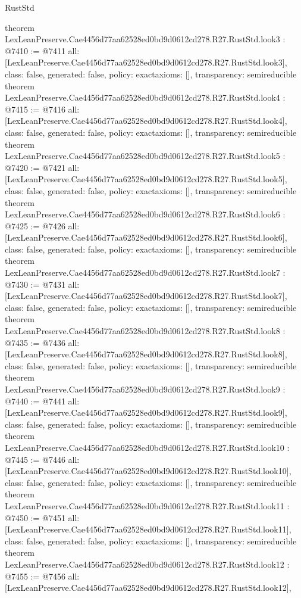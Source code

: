 \begin{lexlean}{RustStd}
\begin{coremodule}
{}
theorem LexLeanPreserve.Cae4456d77aa62528ed0bd9d0612cd278.R27.RustStd.look3 : @7410 := @7411 {
  all: [LexLeanPreserve.Cae4456d77aa62528ed0bd9d0612cd278.R27.RustStd.look3],
  class: false,
  generated: false,
  policy: exact{axioms: []},
  transparency: semireducible
}
theorem LexLeanPreserve.Cae4456d77aa62528ed0bd9d0612cd278.R27.RustStd.look4 : @7415 := @7416 {
  all: [LexLeanPreserve.Cae4456d77aa62528ed0bd9d0612cd278.R27.RustStd.look4],
  class: false,
  generated: false,
  policy: exact{axioms: []},
  transparency: semireducible
}
theorem LexLeanPreserve.Cae4456d77aa62528ed0bd9d0612cd278.R27.RustStd.look5 : @7420 := @7421 {
  all: [LexLeanPreserve.Cae4456d77aa62528ed0bd9d0612cd278.R27.RustStd.look5],
  class: false,
  generated: false,
  policy: exact{axioms: []},
  transparency: semireducible
}
theorem LexLeanPreserve.Cae4456d77aa62528ed0bd9d0612cd278.R27.RustStd.look6 : @7425 := @7426 {
  all: [LexLeanPreserve.Cae4456d77aa62528ed0bd9d0612cd278.R27.RustStd.look6],
  class: false,
  generated: false,
  policy: exact{axioms: []},
  transparency: semireducible
}
theorem LexLeanPreserve.Cae4456d77aa62528ed0bd9d0612cd278.R27.RustStd.look7 : @7430 := @7431 {
  all: [LexLeanPreserve.Cae4456d77aa62528ed0bd9d0612cd278.R27.RustStd.look7],
  class: false,
  generated: false,
  policy: exact{axioms: []},
  transparency: semireducible
}
theorem LexLeanPreserve.Cae4456d77aa62528ed0bd9d0612cd278.R27.RustStd.look8 : @7435 := @7436 {
  all: [LexLeanPreserve.Cae4456d77aa62528ed0bd9d0612cd278.R27.RustStd.look8],
  class: false,
  generated: false,
  policy: exact{axioms: []},
  transparency: semireducible
}
theorem LexLeanPreserve.Cae4456d77aa62528ed0bd9d0612cd278.R27.RustStd.look9 : @7440 := @7441 {
  all: [LexLeanPreserve.Cae4456d77aa62528ed0bd9d0612cd278.R27.RustStd.look9],
  class: false,
  generated: false,
  policy: exact{axioms: []},
  transparency: semireducible
}
theorem LexLeanPreserve.Cae4456d77aa62528ed0bd9d0612cd278.R27.RustStd.look10 : @7445 := @7446 {
  all: [LexLeanPreserve.Cae4456d77aa62528ed0bd9d0612cd278.R27.RustStd.look10],
  class: false,
  generated: false,
  policy: exact{axioms: []},
  transparency: semireducible
}
theorem LexLeanPreserve.Cae4456d77aa62528ed0bd9d0612cd278.R27.RustStd.look11 : @7450 := @7451 {
  all: [LexLeanPreserve.Cae4456d77aa62528ed0bd9d0612cd278.R27.RustStd.look11],
  class: false,
  generated: false,
  policy: exact{axioms: []},
  transparency: semireducible
}
theorem LexLeanPreserve.Cae4456d77aa62528ed0bd9d0612cd278.R27.RustStd.look12 : @7455 := @7456 {
  all: [LexLeanPreserve.Cae4456d77aa62528ed0bd9d0612cd278.R27.RustStd.look12],
}
\end{coremodule}
\end{lexlean}
